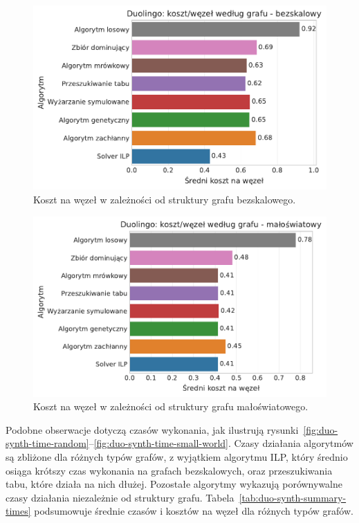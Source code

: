 \begin{figure}[H]
  \centering
  \includegraphics[width=0.65\linewidth]{assets/figures/benchmark/synthetic/duolingo_cost_per_node_by_graph_scale_free.pdf}
  \caption{Koszt na węzeł w zależności od struktury grafu bezskalowego.}
  \label{fig:duo-synth-cost-scale-free}
\end{figure}

\begin{figure}[H]
  \centering
  \includegraphics[width=0.65\linewidth]{assets/figures/benchmark/synthetic/duolingo_cost_per_node_by_graph_small_world.pdf}
  \caption{Koszt na węzeł w zależności od struktury grafu małoświatowego.}
  \label{fig:duo-synth-cost-small-world}
\end{figure}

Podobne obserwacje dotyczą czasów wykonania, jak ilustrują rysunki~\ref{fig:duo-synth-time-random}--\ref{fig:duo-synth-time-small-world}. Czasy działania algorytmów są zbliżone dla różnych typów grafów, z wyjątkiem algorytmu ILP, który średnio osiąga krótszy czas wykonania na grafach bezskalowych, oraz przeszukiwania tabu, które działa na nich dłużej. Pozostałe algorytmy wykazują porównywalne czasy działania niezależnie od struktury grafu. Tabela~\ref{tab:duo-synth-summary-times} podsumowuje średnie czasów i kosztów na węzeł dla różnych typów grafów.

